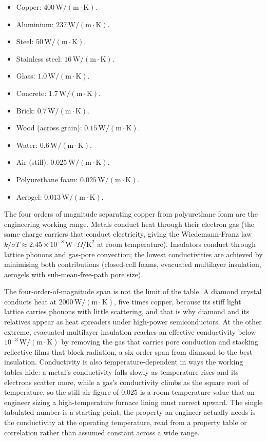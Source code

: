 \begin{itemize}[leftmargin=*]
  \item Copper: $400\,\text{W}/(\text{m}\cdot\si{\kelvin})$.
  \item Aluminium: $237\,\text{W}/(\text{m}\cdot\si{\kelvin})$.
  \item Steel: $50\,\text{W}/(\text{m}\cdot\si{\kelvin})$.
  \item Stainless steel: $16\,\text{W}/(\text{m}\cdot\si{\kelvin})$.
  \item Glass: $1.0\,\text{W}/(\text{m}\cdot\si{\kelvin})$.
  \item Concrete: $1.7\,\text{W}/(\text{m}\cdot\si{\kelvin})$.
  \item Brick: $0.7\,\text{W}/(\text{m}\cdot\si{\kelvin})$.
  \item Wood (across grain): $0.15\,\text{W}/(\text{m}\cdot\si{\kelvin})$.
  \item Water: $0.6\,\text{W}/(\text{m}\cdot\si{\kelvin})$.
  \item Air (still): $0.025\,\text{W}/(\text{m}\cdot\si{\kelvin})$.
  \item Polyurethane foam: $0.025\,\text{W}/(\text{m}\cdot\si{\kelvin})$.
  \item Aerogel: $0.013\,\text{W}/(\text{m}\cdot\si{\kelvin})$.
\end{itemize}

The four orders of magnitude separating copper from polyurethane
foam are the engineering working range. Metals conduct heat through
their electron gas (the same charge carriers that conduct electricity,
giving the Wiedemann-Franz law $k/\sigma T \approx 2.45 \times
10^{-8}\,\text{W}\cdot\Omega/\si{\kelvin}^2$ at room temperature).
Insulators conduct through lattice phonons and gas-pore convection;
the lowest conductivities are achieved by minimising both contributions
(closed-cell foams, evacuated multilayer insulation, aerogels with
sub-mean-free-path pore size).

The four-order-of-magnitude span is not the limit of the table. A
diamond crystal conducts heat at $2000\,\text{W}/(\text{m}\cdot\si{
\kelvin})$, five times copper, because its stiff light lattice carries
phonons with little scattering, and that is why diamond and its
relatives appear as heat spreaders under high-power semiconductors. At
the other extreme, evacuated multilayer insulation reaches an effective
conductivity below $10^{-3}\,\text{W}/(\text{m}\cdot\si{\kelvin})$ by
removing the gas that carries pore conduction and stacking reflective
films that block radiation, a six-order span from diamond to the best
insulation. Conductivity is also temperature-dependent in ways the
working tables hide: a metal's conductivity falls slowly as temperature
rises and its electrons scatter more, while a gas's conductivity climbs
as the square root of temperature, so the still-air figure of $0.025$ is
a room-temperature value that an engineer sizing a high-temperature
furnace lining must correct upward. The single tabulated number is a
starting point; the property an engineer actually needs is the
conductivity at the operating temperature, read from a property table or
correlation rather than assumed constant across a wide range.

